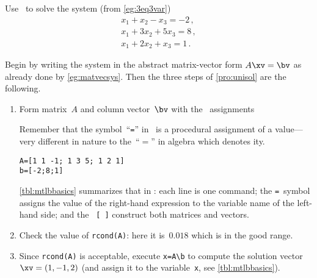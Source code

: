 \begin{example} \label{eg:3eq3varc}
Use \script\ to solve the system (from \cref{eg:3eq3var})
\begin{equation*}
\begin{array}{l}
x_1+x_2-x_3=-2\,,\\
x_1+3x_2+5x_3=8\,,\\
x_1+2x_2+x_3=1\,.
\end{array}
\end{equation*}
\begin{solution} 
Begin by writing the system in the abstract matrix-vector form \(A\xv=\bv\) as already done by \cref{eg:matvecsys}.
Then the three steps of \cref{pro:unisol} are the following.
\begin{enumerate}
\item Form matrix~\(A\) and {column vector}~\(\bv\) with the \script\ assignments
\begin{aside}
Remember that the symbol~``\texttt{=}'' in \script\ is a procedural 
assignment of a value---very different in nature to the~``\(=\)'' in 
algebra which denotes ity.
\end{aside}%
\begin{verbatim}
A=[1 1 -1; 1 3 5; 1 2 1]
b=[-2;8;1]
\end{verbatim}
\cref{tbl:mtlbbasics} summarizes that in \script: each line is one command; the \verb|=|~symbol assigns the value of the right-hand expression to the variable name of the left-hand side; and the ~\verb|[ ]| construct both matrices and vectors.
\item Check the value of \verb|rcond(A)|: here it is~\(0.018\) which is in the good range.
\item Since \verb|rcond(A)| is acceptable,  execute \verb|x=A\b| to compute the solution vector~\(\xv=(1,-1,2)\) (and assign it to the variable~\verb|x|, see \cref{tbl:mtlbbasics}). 

\end{enumerate}
\end{solution}
\end{example}
